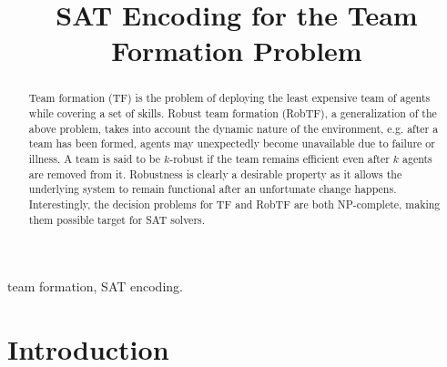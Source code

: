 \documentclass[conference]{IEEEtran}
\theoremstyle{definition}
\begin{document}
\title{SAT Encoding for the Team Formation Problem}
\author{
\and
{}
\and
{}
}

\maketitle

\begin{abstract}
Team formation (TF) is the problem of deploying the least expensive team of agents 
while covering a set of skills. 
Robust team formation (RobTF), a generalization of the above problem,
takes into account the dynamic nature of the environment, e.g. after 
a team has been formed, agents may unexpectedly become unavailable
due to failure or illness. 
A team is said to be $k$-robust if the team remains efficient even after $k$ agents are removed from it.
Robustness is clearly a desirable property as it allows the underlying system to remain 
functional after an unfortunate change happens.
Interestingly, the decision problems for TF and RobTF are both NP-complete, making them
possible target for SAT solvers.
\end{abstract}

\begin{IEEEkeywords}
team formation, SAT encoding.
\end{IEEEkeywords}

\section{Introduction}
\end{document}
